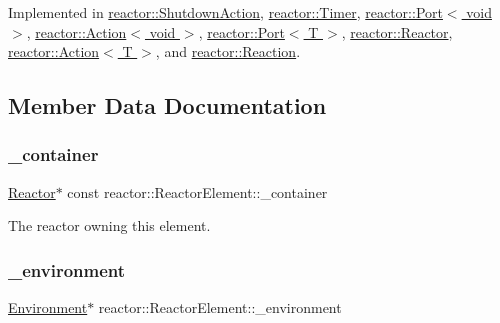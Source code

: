 Implemented in \hyperlink{classreactor_1_1ShutdownAction_a21c23857012b384cd06f55e002291824}{reactor\+::\+Shutdown\+Action}, \hyperlink{classreactor_1_1Timer_af820c0879317afb9b98ddc890ac96271}{reactor\+::\+Timer}, \hyperlink{classreactor_1_1Port_3_01void_01_4_a3a84b8d17b1a43197a753847b0df1777}{reactor\+::\+Port$<$ void $>$}, \hyperlink{classreactor_1_1Action_3_01void_01_4_a6ba1aa14251401ebb7a4b13624d5ce92}{reactor\+::\+Action$<$ void $>$}, \hyperlink{classreactor_1_1Port_ae182b2b10c53f2a21c424437dfc2b40e}{reactor\+::\+Port$<$ T $>$}, \hyperlink{classreactor_1_1Reactor_ad254458867114f09a72e1e285ffc03d2}{reactor\+::\+Reactor}, \hyperlink{classreactor_1_1Action_a60364e6742fb14dd515ff355abc5f3db}{reactor\+::\+Action$<$ T $>$}, and \hyperlink{classreactor_1_1Reaction_a504359d36ac61662668787c9b650c314}{reactor\+::\+Reaction}.



\subsection{Member Data Documentation}
\mbox{\label{classreactor_1_1ReactorElement_a247c6863a035b15938b4bbc0a07b664d}} 
\subsubsection{\texorpdfstring{\+\_\+container}{\_container}}
{\footnotesize\ttfamily \hyperlink{classreactor_1_1Reactor}{Reactor}$\ast$ const reactor\+::\+Reactor\+Element\+::\+\_\+container\hspace{0.3cm}{\ttfamily [private]}}



The reactor owning this element. 

\mbox{\label{classreactor_1_1ReactorElement_a07b433591c3e20916b46ecd6ef3c2bf8}} 
\subsubsection{\texorpdfstring{\+\_\+environment}{\_environment}}
{\footnotesize\ttfamily \hyperlink{classreactor_1_1Environment}{Environment}$\ast$ reactor\+::\+Reactor\+Element\+::\+\_\+environment\hspace{0.3cm}{\ttfamily [private]}}

